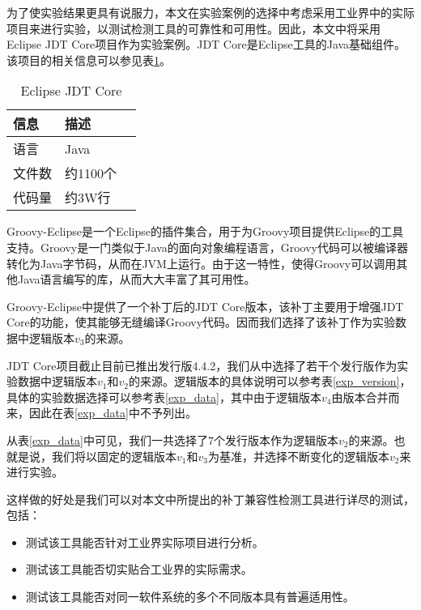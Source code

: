 为了使实验结果更具有说服力，本文在实验案例的选择中考虑采用工业界中的实际项目来进行实验，以测试检测工具的可靠性和可用性。因此，本文中将采用Eclipse JDT Core项目作为实验案例。JDT Core是Eclipse工具的Java基础组件。该项目的相关信息可以参见表\ref {jdt_core}。

\begin{table}[H]
	\caption{Eclipse JDT Core}
	\label{jdt_core}
	\centering
	\begin{tabular}{llc}
		\toprule[1.5pt]
		{\heiti 信息} & {\heiti 描述} \\\midrule[1pt]
		语言 & Java \\
		文件数 & 约1100个\\
		代码量 & 约3W行\\
		\bottomrule[1.5pt]
	\end{tabular}
\end{table}

Groovy-Eclipse是一个Eclipse的插件集合，用于为Groovy项目提供Eclipse的工具支持。Groovy是一门类似于Java的面向对象编程语言，Groovy代码可以被编译器转化为Java字节码，从而在JVM上运行。由于这一特性，使得Groovy可以调用其他Java语言编写的库，从而大大丰富了其可用性。

Groovy-Eclipse中提供了一个补丁后的JDT Core版本，该补丁主要用于增强JDT Core的功能，使其能够无缝编译Groovy代码。因而我们选择了该补丁作为实验数据中逻辑版本$v_3$的来源。

JDT Core项目截止目前已推出发行版4.4.2，我们从中选择了若干个发行版作为实验数据中逻辑版本$v_1$和$v_2$的来源。逻辑版本的具体说明可以参考表\ref {exp_version}，具体的实验数据选择可以参考表\ref {exp_data}，其中由于逻辑版本$v_4$由版本合并而来，因此在表\ref {exp_data}中不予列出。

从表\ref {exp_data}中可见，我们一共选择了7个发行版本作为逻辑版本$v_2$的来源。也就是说，我们将以固定的逻辑版本$v_1$和$v_3$为基准，并选择不断变化的逻辑版本$v_2$来进行实验。

这样做的好处是我们可以对本文中所提出的补丁兼容性检测工具进行详尽的测试，包括：
\begin{itemize}
	\item 测试该工具能否针对工业界实际项目进行分析。
	\item 测试该工具能否切实贴合工业界的实际需求。
	\item 测试该工具能否对同一软件系统的多个不同版本具有普遍适用性。
\end{itemize}

